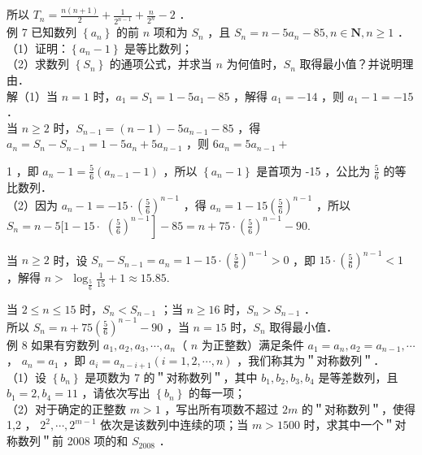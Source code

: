 \documentclass[10pt]{article}
\begin{document}
所以 \(T_{n}=\frac{n(n+1)}{2}+\frac{1}{2^{n-1}}+\frac{n}{2^{n}}-2\) ．\\
例 7 已知数列 \(\left\{a_{n}\right\}\) 的前 \(n\) 项和为 \(S_{n}\) ，且 \(S_{n}=n-5 a_{n}-85, n \in \mathbf{N}, n \geqslant 1\) ．\\
（1）证明：\(\left\{a_{n}-1\right\}\) 是等比数列；\\
（2）求数列 \(\left\{S_{n}\right\}\) 的通项公式，并求当 \(n\) 为何值时，\(S_{n}\) 取得最小值？并说明理由．\\
解（1）当 \(n=1\) 时，\(a_{1}=S_{1}=1-5 a_{1}-85\) ，解得 \(a_{1}=-14\) ，则 \(a_{1}-1=-15\) ．\\
当 \(n \geqslant 2\) 时，\(S_{n-1}=(n-1)-5 a_{n-1}-85\) ，得 \(a_{n}=S_{n}-S_{n-1}=1-5 a_{n}+5 a_{n-1}\) ，则 \(6 a_{n}=5 a_{n-1}+\)

1 ，即 \(a_{n}-1=\frac{5}{6}\left(a_{n-1}-1\right)\) ，所以 \(\left\{a_{n}-1\right\}\) 是首项为 -15 ，公比为 \(\frac{5}{6}\) 的等比数列．\\
（2）因为 \(a_{n}-1=-15 \cdot\left(\frac{5}{6}\right)^{n-1}\) ，得 \(a_{n}=1-15\left(\frac{5}{6}\right)^{n-1}\) ，所以 \(S_{n}=n-5[1-15 \cdot\) \(\left.\left(\frac{5}{6}\right)^{n-1}\right]-85=n+75 \cdot\left(\frac{5}{6}\right)^{n-1}-90\).

当 \(n \geqslant 2\) 时，设 \(S_{n}-S_{n-1}=a_{n}=1-15 \cdot\left(\frac{5}{6}\right)^{n-1}>0\) ，即 \(15 \cdot\left(\frac{5}{6}\right)^{n-1}<1\) ，解得 \(n>\) \(\log _{\frac{5}{6}} \frac{1}{15}+1 \approx 15.85\).

当 \(2 \leqslant n \leqslant 15\) 时，\(S_{n}<S_{n-1}\) ；当 \(n \geqslant 16\) 时，\(S_{n}>S_{n-1}\) ．\\
所以 \(S_{n}=n+75\left(\frac{5}{6}\right)^{n-1}-90\) ，当 \(n=15\) 时，\(S_{n}\) 取得最小值．\\
例 8 如果有穷数列 \(a_{1}, a_{2}, a_{3}, \cdots, a_{n}\)（ \(n\) 为正整数）满足条件 \(a_{1}=a_{n}, a_{2}=a_{n-1}, \cdots\) ， \(a_{n}=a_{1}\) ，即 \(a_{i}=a_{n-i+1}(i=1,2, \cdots, n)\) ，我们称其为＂对称数列＂．\\
（1）设 \(\left\{b_{n}\right\}\) 是项数为 7 的＂对称数列＂，其中 \(b_{1}, b_{2}, b_{3}, b_{4}\) 是等差数列，且 \(b_{1}=2, b_{4}=11\) ，请依次写出 \(\left\{b_{n}\right\}\) 的每一项；\\
（2）对于确定的正整数 \(m>1\) ，写出所有项数不超过 \(2 m\) 的＂对称数列＂，使得 1,2 ， \(2^{2}, \cdots, 2^{m-1}\) 依次是该数列中连续的项；当 \(m>1500\) 时，求其中一个＂对称数列＂前 2008 项的和 \(S_{2008}\) ．
\end{document}
